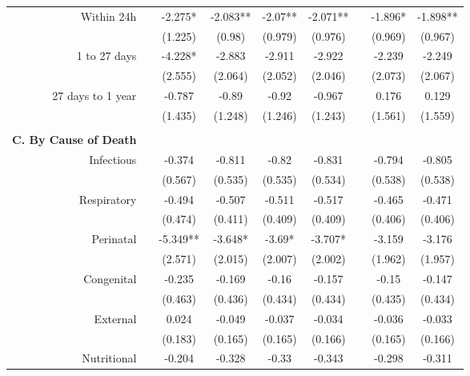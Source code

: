 \begin{table}[h!]
\begin{footnotesize}
\begin{center}
{\begin{threeparttable}[b]
\begin{tabular}{rrccccccc}
    \multicolumn{1}{p{15.145em}}{Within 24h} &       & -2.275* & -2.083** & -2.07** & -2.071** &       & -1.896* & -1.898** \\
          &       & (1.225) & (0.98) & (0.979) & (0.976) &       & (0.969) & (0.967) \\
    \multicolumn{1}{p{15.145em}}{1 to 27 days} &       & -4.228* & -2.883 & -2.911 & -2.922 &       & -2.239 & -2.249 \\
          &       & (2.555) & (2.064) & (2.052) & (2.046) &       & (2.073) & (2.067) \\
    \multicolumn{1}{p{15.145em}}{27 days to 1 year} &       & -0.787 & -0.89 & -0.92 & -0.967 &       & 0.176 & 0.129 \\
          &       & (1.435) & (1.248) & (1.246) & (1.243) &       & (1.561) & (1.559) \\
          &       &       &       &       &       &       &       &  \\
    \midrule
    \multicolumn{1}{p{15.145em}}{\textbf{C. By Cause of Death}} &       &       &       &       &       &       &       &  \\
    \multicolumn{1}{p{15.145em}}{Infectious} &       & -0.374 & -0.811 & -0.82 & -0.831 &       & -0.794 & -0.805 \\
          &       & (0.567) & (0.535) & (0.535) & (0.534) &       & (0.538) & (0.538) \\
    \multicolumn{1}{p{15.145em}}{Respiratory} &       & -0.494 & -0.507 & -0.511 & -0.517 &       & -0.465 & -0.471 \\
          &       & (0.474) & (0.411) & (0.409) & (0.409) &       & (0.406) & (0.406) \\
    \multicolumn{1}{p{15.145em}}{Perinatal} &       & -5.349** & -3.648* & -3.69* & -3.707* &       & -3.159 & -3.176 \\
          &       & (2.571) & (2.015) & (2.007) & (2.002) &       & (1.962) & (1.957) \\
    \multicolumn{1}{p{15.145em}}{Congenital} &       & -0.235 & -0.169 & -0.16 & -0.157 &       & -0.15 & -0.147 \\
          &       & (0.463) & (0.436) & (0.434) & (0.434) &       & (0.435) & (0.434) \\
    \multicolumn{1}{p{15.145em}}{External} &       & 0.024 & -0.049 & -0.037 & -0.034 &       & -0.036 & -0.033 \\
          &       & (0.183) & (0.165) & (0.165) & (0.166) &       & (0.165) & (0.166) \\
    \multicolumn{1}{p{15.145em}}{Nutritional} &       & -0.204 & -0.328 & -0.33 & -0.343 &       & -0.298 & -0.311 \\

\end{tabular}
\end{threeparttable}}
\end{center}
\end{footnotesize}
\end{table}
